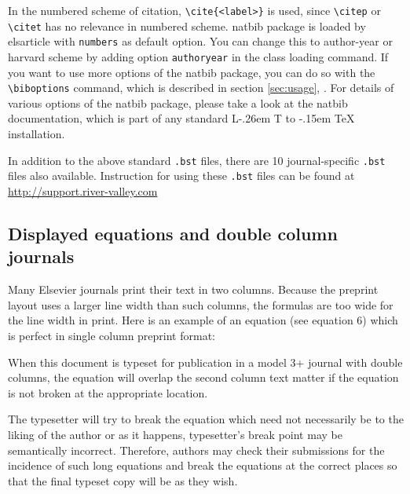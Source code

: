 \documentclass[a4paper,12pt]{article}
\makeatletter
\def\file#1{\textsf{#1}\xspace}
\DeclareRobustCommand{\LaTeX}{L\kern-.26em%
        {\sbox\z@ T%
         \vbox to\ht\z@{\hbox{\check@mathfonts
           \fontsize\sf@size\z@
           \math@fontsfalse\selectfont
          A\,}%
         \vss}%
        }%
     \kern-.15em%
    \TeX}
\makeatother
\begin{document}
In the numbered scheme of citation, \verb+\cite{<label>}+ is used,
since \verb+\citep+ or \verb+\citet+ has no relevance in numbered
scheme.  \file{natbib} package is loaded by \file{elsarticle} with
\verb+numbers+ as default option.  You can change this to author-year
or harvard scheme by adding option \verb+authoryear+ in the class
loading command.  If you want to use more options of the \file{natbib}
package, you can do so with the \verb+\biboptions+ command, which is
described in section \ref{sec:usage}, .  For
details of various options of the \file{natbib} package, please take a
look at the \file{natbib} documentation, which is part of any standard
\LaTeX{} installation.

In addition to the above standard \verb+.bst+ files, there are 10
journal-specific \verb+.bst+ files also available.
Instruction for using these \verb+.bst+ files can be found at 
\href{http://support.river-valley.com/wiki/index.php?title=Model-wise_bibliographic_style_files}
{http://support.river-valley.com}


\subsection*{Displayed equations and double column journals}

Many Elsevier journals print their text in two columns. Because
the preprint layout uses a larger line width than such columns,
the formulas are too wide for the line width in print. Here is an
example of an equation  (see equation 6) which is perfect in
single column preprint format:

\bigskip
\mywidth=14cm
\def\rulecolor{blue!70}
\def\rulecolor{orange}

\bigskip
\noindent When this document is typeset for publication in a
model 3+ journal with double columns, the equation will overlap
the second column text matter if the equation is not broken at
the appropriate location.

\bigskip
\bigskip
\def\rulecolor{blue!70}
\mywidth=14.5cm
\def\rulecolor{orange}

\medskip

\noindent The typesetter will try to break the equation which
need not necessarily be to the liking of the author or as it
happens, typesetter's break point may be semantically incorrect.
Therefore, authors may check their submissions for the incidence
of such long equations and break the equations at the correct
places so that the final typeset copy will be as they wish.
\end{document}

